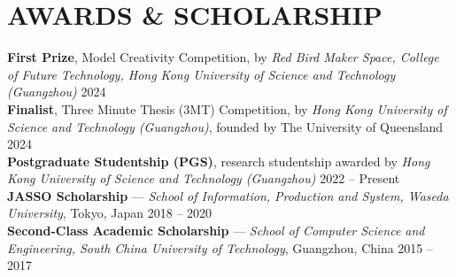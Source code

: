 \section*{AWARDS \& SCHOLARSHIP}
\noindent
\textbf{First Prize}, Model Creativity Competition, by\textit{ Red Bird Maker Space, College of Future Technology, Hong Kong University of Science and Technology (Guangzhou)}
    \hfill 2024 \\
\noindent
\textbf{Finalist}, Three Minute Thesis (3MT) Competition, by \textit{Hong Kong University of Science and Technology (Guangzhou)}, founded by The University of Queensland
    \hfill 2024\\
\noindent
\textbf{Postgraduate Studentship (PGS)}, research studentship awarded by \textit{Hong Kong University of Science and Technology (Guangzhou)}
    \hfill 2022 -- Present\\
\noindent
\textbf{JASSO Scholarship} — \textit{School of Information, Production and System, Waseda University}, Tokyo, Japan
    \hfill 2018 -- 2020\\
\noindent
\textbf{Second-Class Academic Scholarship} — \textit{School of Computer Science and Engineering, South China University of Technology}, Guangzhou, China
    \hfill 2015 -- 2017
